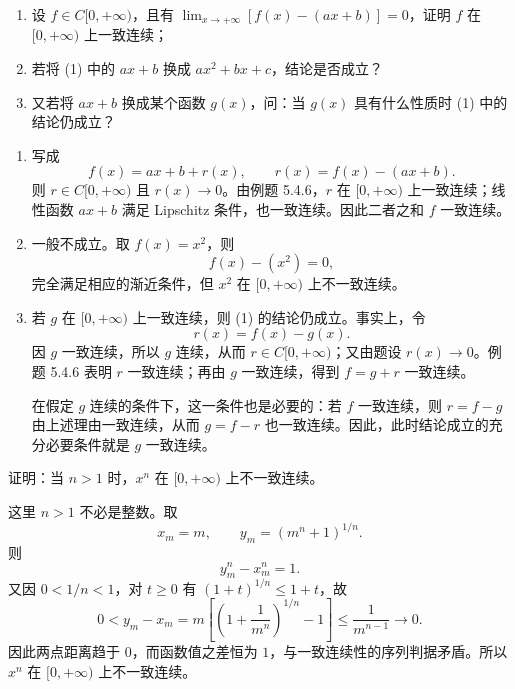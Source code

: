 \begin{xexercise}[5]
\begin{enumerate}[label=(\arabic*)]
    \item 设 $f\in C[0,+\infty)$，且有 $\lim_{x\to+\infty}[f(x)-(ax+b)]=0$，证明 $f$ 在 $[0,+\infty)$ 上一致连续；
    \item 若将 (1) 中的 $ax+b$ 换成 $ax^2+bx+c$，结论是否成立？
    \item 又若将 $ax+b$ 换成某个函数 $g(x)$，问：当 $g(x)$ 具有什么性质时 (1) 中的结论仍成立？
  \end{enumerate}
\end{xexercise}
\begin{xsolution}
\begin{enumerate}[label=(\arabic*)]
 \item 写成
 \[
  f(x)=ax+b+r(x),
  \qquad r(x)=f(x)-(ax+b).
 \]
 则 $r\in C[0,+\infty)$ 且 $r(x)\to0$。由例题 5.4.6，$r$ 在 $[0,+\infty)$ 上一致连续；线性函数 $ax+b$ 满足 Lipschitz 条件，也一致连续。因此二者之和 $f$ 一致连续。

 \item 一般不成立。取 $f(x)=x^2$，则
 \[
  f(x)-(x^2)=0,
 \]
 完全满足相应的渐近条件，但 $x^2$ 在 $[0,+\infty)$ 上不一致连续。

 \item 若 $g$ 在 $[0,+\infty)$ 上一致连续，则 (1) 的结论仍成立。事实上，令
 \[
  r(x)=f(x)-g(x).
 \]
 因 $g$ 一致连续，所以 $g$ 连续，从而 $r\in C[0,+\infty)$；又由题设 $r(x)\to0$。例题 5.4.6 表明 $r$ 一致连续；再由 $g$ 一致连续，得到 $f=g+r$ 一致连续。

 在假定 $g$ 连续的条件下，这一条件也是必要的：若 $f$ 一致连续，则 $r=f-g$ 由上述理由一致连续，从而 $g=f-r$ 也一致连续。因此，此时结论成立的充分必要条件就是 $g$ 一致连续。
\end{enumerate}
\end{xsolution}


\begin{xexercise}[6]
证明：当 $n>1$ 时，$x^n$ 在 $[0,+\infty)$ 上不一致连续。
\end{xexercise}
\begin{xsolution}
这里 $n>1$ 不必是整数。取
\[
 x_m=m,
 \qquad
 y_m=(m^n+1)^{1/n}.
\]
则
\[
 y_m^n-x_m^n=1.
\]
又因 $0<1/n<1$，对 $t\ge0$ 有 $(1+t)^{1/n}\le1+t$，故
\[
 0<y_m-x_m
 =m\left[\left(1+\frac1{m^n}\right)^{1/n}-1\right]
 \le \frac1{m^{n-1}}\to0.
\]
因此两点距离趋于 $0$，而函数值之差恒为 $1$，与一致连续性的序列判据矛盾。所以 $x^n$ 在 $[0,+\infty)$ 上不一致连续。
\end{xsolution}


